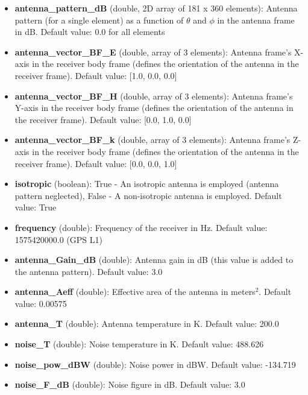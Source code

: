 \begin{itemize}
\item {\bf antenna\_pattern\_dB} (double, 2D array of 181 x 360 elements): Antenna pattern (for a single element) as a function of $\theta$ and $\phi$ in the antenna frame in dB. Default value: 0.0 for all elements

\item {\bf antenna\_vector\_BF\_E} (double, array of 3 elements): Antenna frame's X-axis in the receiver body frame (defines the orientation of the antenna in the receiver frame). Default value: [1.0, 0.0, 0.0]

\item {\bf antenna\_vector\_BF\_H} (double, array of 3 elements): Antenna frame's Y-axis in the receiver body frame (defines the orientation of the antenna in the receiver frame). Default value: [0.0, 1.0, 0.0]

\item {\bf antenna\_vector\_BF\_k} (double, array of 3 elements): Antenna frame's Z-axis in the receiver body frame (defines the orientation of the antenna in the receiver frame). Default value: [0.0, 0.0, 1.0]

\item {\bf isotropic} (boolean): True - An isotropic antenna is employed (antenna pattern neglected), False - A non-isotropic antenna is employed. Default value: True

\item {\bf frequency} (double): Frequency of the receiver in Hz. Default value: 1575420000.0 (GPS L1)

\item {\bf antenna\_Gain\_dB} (double): Antenna gain in dB (this value is added to the antenna pattern). Default value: 3.0

\item {\bf antenna\_Aeff} (double): Effective area of the antenna in meters$^2$. Default value: 0.00575

\item {\bf antenna\_T} (double): Antenna temperature in K. Default value: 200.0

\item {\bf noise\_T} (double): Noise temperature in K. Default value: 488.626

\item {\bf noise\_pow\_dBW} (double): Noise power in dBW. Default value: -134.719

\item {\bf noise\_F\_dB} (double): Noise figure in dB. Default value: 3.0


\end{itemize}
